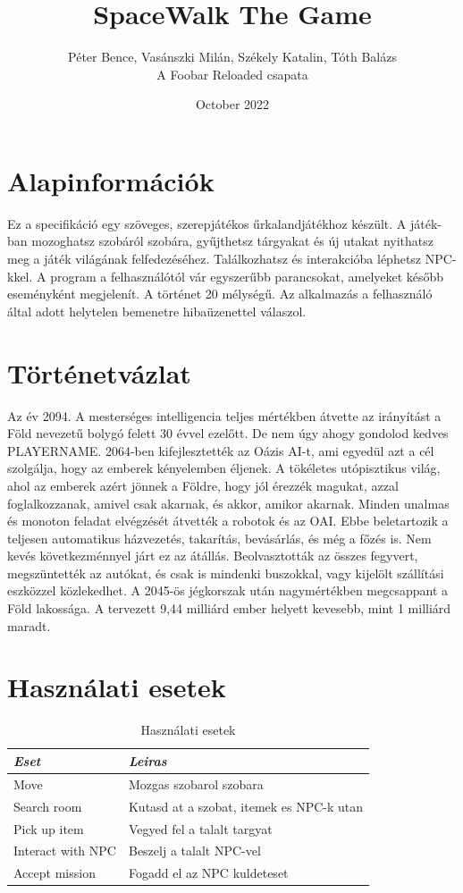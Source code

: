 \documentclass{scrarticle}
\title{SpaceWalk The Game}
\author{Péter Bence, Vasánszki Milán, Székely Katalin, Tóth Balázs\\A Foobar Reloaded csapata}
\date{October 2022}
\begin{document}
\maketitle

\tableofcontents

\section{Alapinformációk} 
Ez a specifikáció egy szöveges, szerepjátékos űrkalandjátékhoz készült. A játék- ban mozoghatsz szobáról szobára, gyűjthetsz tárgyakat és új utakat nyithatsz meg a játék világának felfedezéséhez. Találkozhatsz és interakcióba léphetsz NPC-kkel. A program a felhasználótól vár egyszerűbb parancsokat, amelyeket később eseményként megjelenít. A történet 20 mélységű. Az alkalmazás a felhasználó által adott helytelen bemenetre hibaüzenettel válaszol.

\section{Történetvázlat}
Az év 2094. A mesterséges intelligencia teljes mértékben átvette az irányítást a Föld nevezetű bolygó felett 30 évvel ezelőtt. De nem úgy ahogy gondolod kedves PLAYERNAME. 2064-ben kifejlesztették az Oázis AI-t, ami egyedül azt a cél szolgálja, hogy az emberek kényelemben éljenek. A tökéletes utópisztikus világ, ahol az emberek azért jönnek a Földre, hogy jól érezzék magukat, azzal foglalkozzanak, amivel csak akarnak, és akkor, amikor akarnak. Minden unalmas és monoton feladat elvégzését átvették a robotok és az OAI. Ebbe beletartozik a teljesen automatikus házvezetés, takarítás, bevásárlás, és még a főzés is. Nem kevés következménnyel járt ez az átállás. Beolvasztották az összes fegyvert, megszüntették az autókat, és csak is mindenki buszokkal, vagy kijelölt szállítási eszközzel közlekedhet. A 2045-ös jégkorszak után nagymértékben megcsappant a Föld lakossága. A tervezett 9,44 milliárd ember helyett kevesebb, mint 1 milliárd maradt.

\section{Használati esetek}
\begin{table}[H] \centering
    \caption{Használati esetek}\label{tab:usecasetable}
    \begin{tabular}{@{}ll@{}}
        \emph{Eset} & \emph{Leiras}\\ \hline
        Move         & Mozgas szobarol szobara\\
        Search room  & Kutasd at a szobat, itemek es NPC-k utan\\
        Pick up item & Vegyed fel a talalt targyat\\
        Interact with NPC & Beszelj a talalt NPC-vel\\
        Accept mission & Fogadd el az NPC kuldeteset
    \end{tabular}
\end{table}
\end{document}
